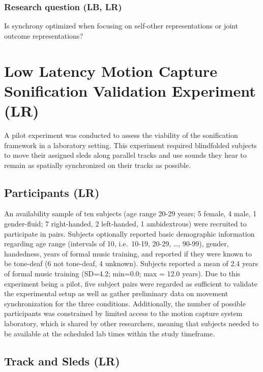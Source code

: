 \documentclass[10pt,a4paper,onecolumn]{article}
\begin{document}
\hypertarget{research-question-lb-lr}{%
\subsubsection{Research question (LB, LR)}\label{research-question-lb-lr}}

Is synchrony optimized when focusing on self-other representations or joint outcome representations?

\hypertarget{low-latency-motion-capture-sonification-validation-experiment-lr}{%
\section{Low Latency Motion Capture Sonification Validation Experiment (LR)}\label{low-latency-motion-capture-sonification-validation-experiment-lr}}

A pilot experiment was conducted to assess the viability of the sonification framework in a laboratory setting. This experiment required blindfolded subjects to move their assigned sleds along parallel tracks and use sounds they hear to remain as spatially synchronized on their tracks as possible.

\hypertarget{participants-lr}{%
\subsection{Participants (LR)}\label{participants-lr}}

An availability sample of ten subjects (age range 20-29 years; 5 female, 4 male, 1 gender-fluid; 7 right-handed, 2 left-handed, 1 ambidextrous) were recruited to participate in pairs. Subjects optionally reported basic demographic information regarding age range (intervals of 10, i.e.~10-19, 20-29, \ldots, 90-99), gender, handedness, years of formal music training, and reported if they were known to be tone-deaf (6 not tone-deaf, 4 unknown). Subjects reported a mean of 2.4 years of formal music training (SD=4.2; min=0.0; max = 12.0 years). Due to this experiment being a pilot, five subject pairs were regarded as sufficient to validate the experimental setup as well as gather preliminary data on movement synchronization for the three conditions. Additionally, the number of possible participants was constrained by limited access to the motion capture system laboratory, which is shared by other researchers, meaning that subjects needed to be available at the scheduled lab times within the study timeframe.

\hypertarget{track-and-sleds-lr}{%
\subsection{Track and Sleds (LR)}\label{track-and-sleds-lr}}
\end{document}
